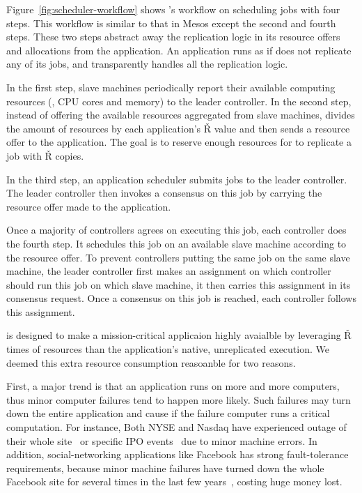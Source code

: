 Figure~\ref{fig:scheduler-workflow} shows \tripod's workflow on scheduling jobs 
with four steps. This workflow is similar to that in Mesos except the second 
and fourth steps. These two steps \tripod abstract away the replication logic 
in its resource offers and allocations from the application. An application runs 
as if \xxx does not replicate any of its jobs, and \tripod transparently 
handles all the replication logic.

In the first step, slave machines periodically report their available computing 
resources (\eg, CPU cores and memory) to the leader controller. In the second 
step, instead of offering the available resources aggregated from slave 
machines, \tripod divides the amount of resources by each application's \v{R} 
value and then sends a resource offer to the application. The goal is to 
reserve enough resources for \tripod to replicate a job with \v{R} copies.

In the third step, an application scheduler submits jobs to the leader 
controller. The leader controller then invokes a consensus on this job by 
carrying the resource offer made to the application.

Once a majority of controllers agrees on executing this job, each controller 
does the fourth step. It schedules this job on an available slave machine 
according to the resource offer. To prevent controllers putting the same job on 
the same slave machine, the leader controller first makes an assignment on 
which controller should run this job on which slave machine, it then carries 
this assignment in its consensus request. Once a consensus on this job is 
reached, each controller follows this assignment.



 \tripod is designed to make a
mission-critical applicaion highly avaialble by leveraging \v{R} times of 
resources than the application's native, unreplicated execution. We deemed this 
extra resource consumption reasoanble for two reasons.

First, a major trend is that an application runs on more and more 
computers, thus minor computer failures tend to happen more likely. Such 
failures may turn down the entire application and cause if the failure computer 
runs a critical computation. For instance, Both NYSE and Nasdaq have experienced 
outage of their whole site~\cite{nyse:halt} or specific IPO 
events~\cite{facebook:ipo:delay} due to minor machine errors. 
In addition, social-networking applications like Facebook has 
strong fault-tolerance requirements, because minor machine failures have turned 
down the whole Facebook site for several times in the last few 
years~\cite{facebook:outage}, costing huge money lost. 

